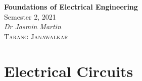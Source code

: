 \documentclass{article}
\date{}
\newcommand{\unitName}{Foundations of Electrical Engineering}
\newcommand{\unitTime}{Semester 2, 2021}
\newcommand{\unitCoordinator}{Dr Jasmin Martin}
\newcommand{\documentAuthors}{\textsc{Tarang Janawalkar}}
\begin{document}
%
\begin{titlepage}
    \vspace*{\fill}
    \begin{center}
        \LARGE{\textbf{\unitName}} \\[0.1in]
        \normalsize{\unitTime} \\[0.2in]
        \normalsize\textit{\unitCoordinator} \\[0.2in]
        \documentAuthors
    \end{center}
    \vspace*{\fill}
    \doclicenseThis
    \thispagestyle{empty}
\end{titlepage}
\newpage
%
\tableofcontents
\newpage
%
\section{Electrical Circuits}
\end{document}
